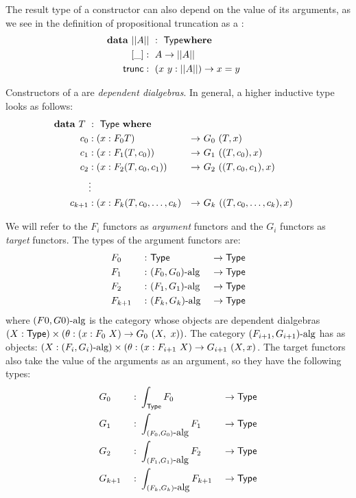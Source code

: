 \documentclass[a4paper,10pt]{article}
\begin{document}
The result type of a constructor can also depend on the value of its
arguments, as we see in the definition of propositional truncation as
a \hit:
%
\begin{alignat*}{2}
  &\rlap{$\data\ || A ||\ :\ \Type \where$} \\
  &&\ \ [\_]   &:\ A \to || A || \\
  &&\ \ \trunc &:\ (x\ y : || A ||) \to x = y
\end{alignat*}

Constructors of a \hit are \emph{dependent dialgebras}. In general, a
higher inductive type looks as follows:
%
\begin{alignat*}{5}
  &\rlap{$\data\ T\ :\ \Type\ \where$}& \\
  &&\ \ c_0    &: (x : F_0 T)                    &\to\ &G_0\ (T, x)& \\
  &&\ \ c_1    &: (x : F_1 (T,c_0))              &\to\ &G_1\ ((T, c_0), x)& \\
  &&\ \ c_2    &: (x : F_2 (T,c_0,c_1))          &\to\ &G_2\ ((T, c_0, c_1), x)& \\
  &&\ \        &\vdots &&\\
  &&\ \ c_{k+1} & : (x : F_k (T,c_0, \hdots, c_k) &\to\ &G_k\ ((T, c_0, \hdots, c_k), x)&
\end{alignat*}

We will refer to the $F_i$ functors as \emph{argument} functors and the
$G_i$ functors as \emph{target} functors. The types of the argument
functors are:
%
\begin{alignat*}{6}
&F_0     &\ :\ &\mathsf{Type}                &\ \to \mathsf{Type}& \\
&F_1     &\ :\ &(F_0, G_0)\mbox{-alg}  &\ \to \mathsf{Type}& \\      
&F_2     &\ :\ &(F_1, G_1)\mbox{-alg}  &\ \to \mathsf{Type}& \\      
&F_{k+1} &\ :\ &(F_k, G_k)\mbox{-alg}  &\ \to \mathsf{Type}&
\end{alignat*}
%
where $(F0, G0)\mbox{-alg}$ is the category whose objects are dependent
dialgebras $(X : \mathsf{Type}) \times (\theta : (x : F_0\ X) \to G_0\ (X,\ x))$. The category
$(F_{i+1},G_{i+1})\mbox{-alg}$ has as objects: $(X : (F_i,G_i)\mbox{-alg}) \times (\theta : (x :
F_{i+1}\ X) \to G_{i+1}\ (X, x)$. The target functors also take the value of
the arguments as an argument, so they have the following types:
%
\begin{alignat*}{6}
&G_0     &\ :\ &\int_{\Type} F_0                &\ \to \Type& \\
&G_1     &\ :\ &\int_{\algcat{(F_0, G_0)}} F_1  &\ \to \Type& \\      
&G_2     &\ :\ &\int_{\algcat{(F_1, G_1)}} F_2  &\ \to \Type& \\      
&G_{k+1} &\ :\ &\int_{\algcat{(F_k, G_k)}} F_{k+1}  &\ \to \Type&
\end{alignat*}
\end{document}
